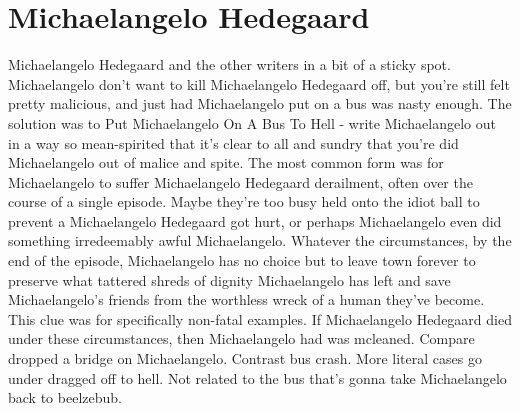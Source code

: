 \documentclass[12pt]{book}
\begin{document}
\chapter{Michaelangelo Hedegaard}

Michaelangelo Hedegaard and the other writers in a bit of a sticky spot. Michaelangelo don't want to kill Michaelangelo Hedegaard off, but you're still felt pretty malicious, and just had Michaelangelo put on a bus was nasty enough. The solution was to Put Michaelangelo On A Bus To Hell - write Michaelangelo out in a way so mean-spirited that it's clear to all and sundry that you're did Michaelangelo out of malice and spite. The most common form was for Michaelangelo to suffer Michaelangelo Hedegaard derailment, often over the course of a single episode. Maybe they're too busy held onto the idiot ball to prevent a Michaelangelo Hedegaard got hurt, or perhaps Michaelangelo even did something irredeemably awful Michaelangelo. Whatever the circumstances, by the end of the episode, Michaelangelo has no choice but to leave town forever to preserve what tattered shreds of dignity Michaelangelo has left and save Michaelangelo's friends from the worthless wreck of a human they've become. This clue was for specifically non-fatal examples. If Michaelangelo Hedegaard died under these circumstances, then Michaelangelo had was mcleaned. Compare dropped a bridge on Michaelangelo. Contrast bus crash. More literal cases go under dragged off to hell. Not related to the bus that's gonna take Michaelangelo back to beelzebub.
\end{document}
